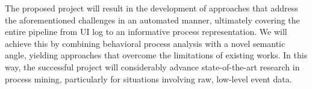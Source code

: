 The proposed project will result in the development of approaches that address the aforementioned challenges in an automated manner, ultimately covering the entire pipeline from UI log to an informative process representation. We will achieve this by combining behavioral process analysis with a novel semantic angle, yielding approaches that overcome the limitations of existing works. In this way, the successful project will considerably advance state-of-the-art research in process mining, particularly for situations involving raw, low-level event data.


 
%

